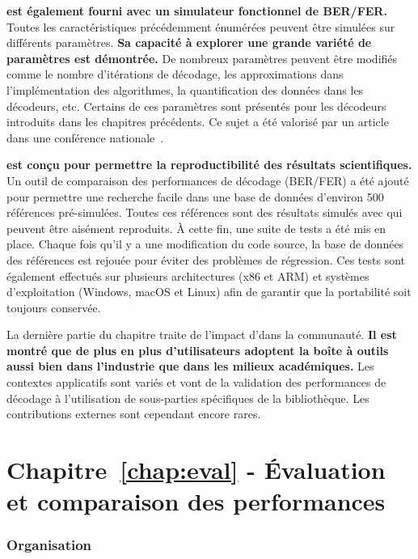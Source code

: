 \textbf{\AFFECT est également fourni avec un simulateur fonctionnel de BER/FER.}
Toutes les caractéristiques précédemment énumérées peuvent être simulées sur
différents paramètres. \textbf{Sa capacité à explorer une grande variété de
paramètres est démontrée.} De nombreux paramètres peuvent être modifiés comme le
nombre d'itérations de décodage, les approximations dans l'implémentation des
algorithmes, la quantification des données dans les décodeurs, etc. Certains de
ces paramètres sont présentés pour les décodeurs introduits dans les chapitres
précédents. Ce sujet a été valorisé par un article dans une conférence
nationale~\cite{Cassagne2017}.

\textbf{\AFFECT est conçu pour permettre la reproductibilité des résultats
scientifiques.} Un outil de comparaison des performances de décodage (BER/FER) a
été ajouté pour permettre une recherche facile dans une base de données
d'environ 500 références pré-simulées. Toutes ces références sont des résultats
simulés avec \AFFECT qui peuvent être aisément reproduits. À cette fin, une
suite de tests a été mis en place. Chaque fois qu'il y a une modification du
code source, la base de données des références est rejouée pour éviter des
problèmes de régression. Ces tests sont également effectués sur plusieurs
architectures (x86 et ARM\R) et systèmes d'exploitation (Windows, macOS et
Linux) afin de garantir que la portabilité soit toujours conservée.

La dernière partie du chapitre traite de l'impact d'\AFFECT dans la communauté.
\textbf{Il est montré que de plus en plus d'utilisateurs adoptent la boîte à
outils \AFFECT aussi bien dans l'industrie que dans les milieux académiques.}
Les contextes applicatifs sont variés et vont de la validation des performances
de décodage à l'utilisation de sous-parties spécifiques de la bibliothèque. Les
contributions externes sont cependant encore rares.

\section*{Chapitre~\ref{chap:eval} - Évaluation et comparaison des performances}

\subsubsection*{Organisation}


